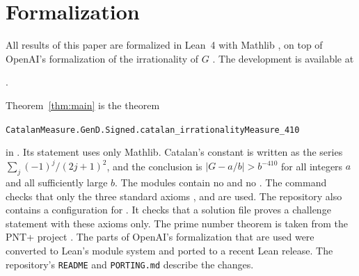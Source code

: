 \section{Formalization}\label{sec:formal}

All results of this paper are formalized in Lean~4 \cite{Lean4} with Mathlib \cite{Mathlib}, on top of OpenAI's
formalization of the irrationality of $G$ \cite{OpenAI2026}. The development is available at
\begin{center}
\FormalizationLink.
\end{center}
Theorem~\ref{thm:main} is the theorem
\begin{center}
{\small\texttt{CatalanMeasure.GenD.Signed.catalan\_irrationalityMeasure\_410}}
\end{center}
in . Its statement uses only Mathlib. Catalan's
constant is written as the series $\sum_j(-1)^j/(2j+1)^2$, and the conclusion is $|G-a/b|>b^{-410}$ for all
integers $a$ and all sufficiently large $b$. The modules contain no  and no .
The command  checks that only the three standard axioms ,
 and  are used. The repository also contains a configuration
 for  \cite{Comparator}. It checks that a solution file proves a
challenge statement with these axioms only. The prime number theorem is taken from the PNT+ project
\cite{PNTPlus}. The parts of OpenAI's formalization that are used were converted to Lean's module system and
ported to a recent Lean release. The repository's \texttt{README} and \texttt{PORTING.md} describe the changes.


